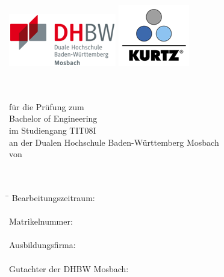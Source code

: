 \begin{titlepage}
\begin{minipage}[t]{\linewidth}  
  \includegraphics[scale=0.6]{Pics/DHBW.png}
  \hspace{10.5cm}
  \includegraphics[scale=0.6]{Pics/Kurtz.png}
\end{minipage}
	    \vspace*{4ex}
  \begin{center}
    {\Large\bf\vspace*{4ex}\mytitle\\}
    {\large\bf\vspace*{4ex}\myKindOfReport\\}
    {\vspace*{4ex}für die Prüfung zum\\Bachelor of Engineering\\}
    {\vspace*{6ex}im Studiengang TIT08I\\an der Dualen Hochschule Baden-Württemberg Mosbach\\}
    {\vspace*{6ex}von\\}
    {\Large\bf\vspace*{2ex}\myname\\}
    {\bf\vspace*{8ex}\mydate\\}
    	\vfill

\begin{tabbing}
	\hspace*{8cm}\=\kill
	Bearbeitungszeitraum: \> \bearbeitungszeitraum \\
	\\
	Matrikelnummer: \> \matrikel \\
	\\
	Ausbildungsfirma: \> \firma \\
	\\
	Gutachter der DHBW Mosbach:	\> \gutachter \\
\end{tabbing}
    \end{center}\end{titlepage}
\restoregeometry
